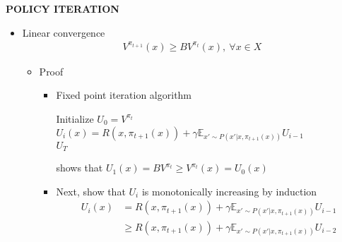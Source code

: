 \begin{whitebox}{\textbf{POLICY ITERATION}}
\begin{itemize}
        where the Bellman operator $B$ is defined as
        \begin{align*}
            BV^\pi(x)=\max_a\left[R(x,a)+\gamma\mathbb{E}_{x'\sim P(x'|x,a)}[V^\pi(x')]\right]
        \end{align*}
        \begin{itemize}
            \item Proof
            \begin{align*}
                BV^{\pi_t}(x)&=\max_a\left[R(x,a)+\gamma\mathbb{E}_{x'\sim P(x'|x,a)}[V^{\pi_t}(x')]\right]\\
                &\geq R(x,\pi_t(x))+\gamma\mathbb{E}_{x'\sim P(x'|x,a)}[V^{\pi_t}(x')]\\
                &=V^{\pi_t}(x)
            \end{align*}
            \item $V^\pi(x)$ will always increase or stay the same
            \item Can converge to different optimal value and policy than value iteration
        \end{itemize}
        \item Linear convergence
        \begin{align*}
            V^{\pi_{t+1}}(x)\geq BV^{\pi_t}(x),\ \forall x\in X
        \end{align*}
        \begin{itemize}
            \item Proof
            \begin{itemize}
                \item Fixed point iteration algorithm
                \begin{algorithmic}
                    \State Initialize $U_0=V^{\pi_t}$
                    \State $U_i(x)=R(x,\pi_{t+1}(x))+\gamma\mathbb{E}_{x'\sim P(x'|x,\pi_{t+1}(x))}U_{i-1}$
                    \EndFor\\
                    \Return $U_T$
                \end{algorithmic}
                shows that $U_1(x)=BV^{\pi_t}\geq V^{\pi_t}(x)=U_0(x)$
                \item Next, show that $U_i$ is monotonically increasing by induction
                \begin{align*}
                    U_i(x)&=R(x,\pi_{t+1}(x))+\gamma\mathbb{E}_{x'\sim P(x'|x,\pi_{t+1}(x))}U_{i-1}\\
                    &\geq R(x,\pi_{t+1}(x))+\gamma\mathbb{E}_{x'\sim P(x'|x,\pi_{t+1}(x))}U_{i-2}\\

\end{align*}
\end{itemize}
\end{itemize}
\end{itemize}
\end{whitebox}
